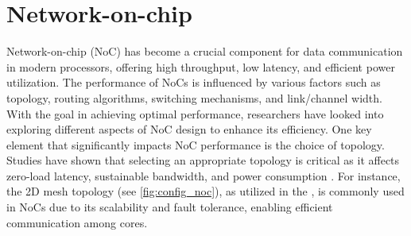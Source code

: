 \section{Network-on-chip}
Network-on-chip (NoC) has become a crucial component for data communication in modern processors, offering high throughput, low latency, and efficient power utilization.
The performance of NoCs is influenced by various factors such as topology, routing algorithms, switching mechanisms, and link/channel width.
With the goal in achieving optimal performance, researchers have looked into exploring different aspects of NoC design to enhance its efficiency.
One key element that significantly impacts NoC performance is the choice of topology.
Studies have shown that selecting an appropriate topology is critical as it affects zero-load latency, sustainable bandwidth, and power consumption \cite{chenPhysicalVsVirtual2010}.
For instance, the 2D mesh topology (see \cref{fig:config_noc}), as utilized in the \graicore{}, is commonly used in NoCs due to its scalability and fault tolerance, enabling efficient communication among cores.



